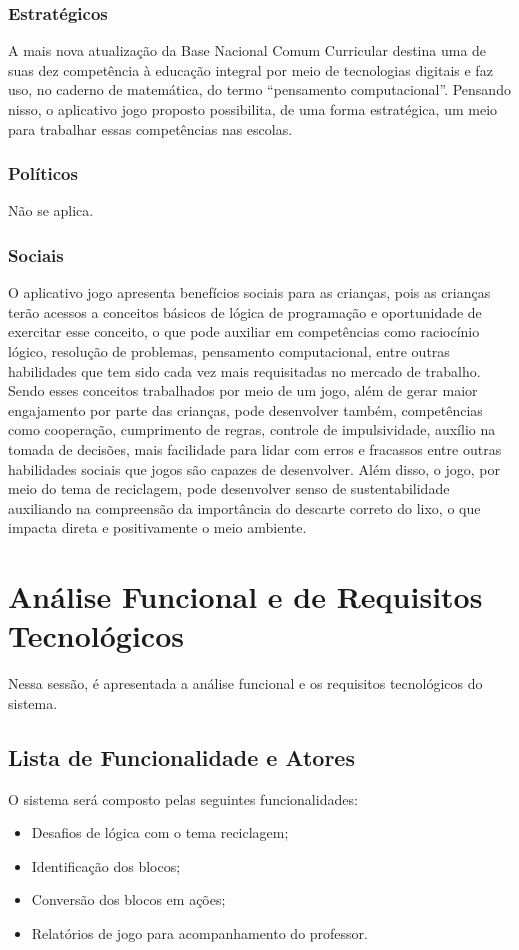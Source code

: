        \subsubsection{Estratégicos}
        A mais nova atualização da Base Nacional Comum Curricular destina uma de suas dez competência à educação integral por meio de tecnologias digitais e faz uso, no caderno de matemática, do termo “pensamento computacional”. Pensando nisso, o aplicativo jogo proposto possibilita, de uma forma estratégica, um meio para trabalhar essas competências nas escolas. 
        
        \subsubsection{Políticos}
        Não se aplica.

        \subsubsection{Sociais}
        O aplicativo jogo apresenta benefícios sociais para as crianças, pois as crianças terão acessos a conceitos básicos de lógica de programação e oportunidade de exercitar esse conceito, o que pode auxiliar em competências como raciocínio lógico, resolução de problemas, pensamento computacional, entre outras habilidades que tem sido cada vez mais requisitadas no mercado de trabalho. Sendo esses conceitos trabalhados por meio de um jogo, além de gerar maior engajamento por parte das crianças, pode desenvolver também, competências como cooperação, cumprimento de regras, controle de impulsividade, auxílio na tomada de decisões, mais facilidade para lidar com erros e fracassos entre outras habilidades sociais que jogos são capazes de desenvolver.
        Além disso, o jogo, por meio do tema de reciclagem, pode desenvolver senso de sustentabilidade auxiliando na compreensão da importância do descarte correto do lixo, o que impacta direta e positivamente  o meio ambiente.

\section{Análise Funcional e de Requisitos Tecnológicos}
    Nessa sessão, é apresentada a análise funcional e os requisitos tecnológicos do sistema.

    \subsection{Lista de Funcionalidade e Atores}
    O sistema será composto  pelas seguintes funcionalidades:
    \begin{itemize}
        \item Desafios de lógica com o tema reciclagem;
        \item Identificação dos blocos;
        \item Conversão dos blocos em ações;
        \item Relatórios de jogo para acompanhamento do professor.
    \end{itemize}
    
